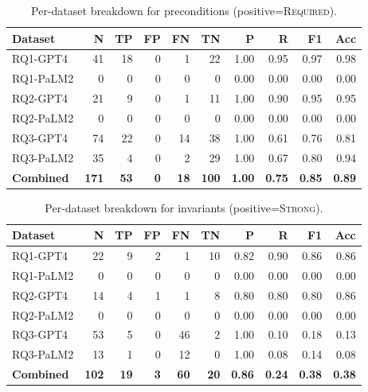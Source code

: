 \begin{table}[h]
  \centering
  \caption{Per-dataset breakdown for preconditions (positive=\textsc{Required}).}
  \label{tab:preconditions}
  \begin{tabular}{lrrrrrrrrr}
    \toprule
    \textbf{Dataset} & \textbf{N} & \textbf{TP} & \textbf{FP} & \textbf{FN} & \textbf{TN} & \textbf{P} & \textbf{R}  & \textbf{F1} & \textbf{Acc} \\
    \midrule
    RQ1-GPT4  & 41  & 18 & 0 & 1 & 22 & 1.00 & 0.95 & 0.97 & 0.98 \\
    RQ1-PaLM2  & 0  & 0 & 0 & 0 & 0 & 0.00 & 0.00 & 0.00 & 0.00 \\
    RQ2-GPT4  & 21  & 9 & 0 & 1 & 11 & 1.00 & 0.90 & 0.95 & 0.95 \\
    RQ2-PaLM2  & 0  & 0 & 0 & 0 & 0 & 0.00 & 0.00 & 0.00 & 0.00 \\
    RQ3-GPT4  & 74  & 22 & 0 & 14 & 38 & 1.00 & 0.61 & 0.76 & 0.81 \\
    RQ3-PaLM2  & 35  & 4 & 0 & 2 & 29 & 1.00 & 0.67 & 0.80 & 0.94 \\
    \midrule
    \textbf{Combined} & \textbf{171} & \textbf{53} & \textbf{0} & \textbf{18} & \textbf{100} & \textbf{1.00} & \textbf{0.75} & \textbf{0.85} & \textbf{0.89} \\
    \bottomrule
  \end{tabular}
\end{table}

\begin{table}[h]
  \centering
  \caption{Per-dataset breakdown for invariants (positive=\textsc{Strong}).}
  \label{tab:invariants}
  \begin{tabular}{lrrrrrrrrr}
    \toprule
    \textbf{Dataset} & \textbf{N} & \textbf{TP} & \textbf{FP} & \textbf{FN} & \textbf{TN} & \textbf{P} & \textbf{R}  & \textbf{F1} & \textbf{Acc} \\
    \midrule
    RQ1-GPT4  & 22  & 9 & 2 & 1 & 10 & 0.82 & 0.90 & 0.86 & 0.86 \\
    RQ1-PaLM2  & 0  & 0 & 0 & 0 & 0 & 0.00 & 0.00 & 0.00 & 0.00 \\
    RQ2-GPT4  & 14  & 4 & 1 & 1 & 8 & 0.80 & 0.80 & 0.80 & 0.86 \\
    RQ2-PaLM2  & 0  & 0 & 0 & 0 & 0 & 0.00 & 0.00 & 0.00 & 0.00 \\
    RQ3-GPT4  & 53  & 5 & 0 & 46 & 2 & 1.00 & 0.10 & 0.18 & 0.13 \\
    RQ3-PaLM2  & 13  & 1 & 0 & 12 & 0 & 1.00 & 0.08 & 0.14 & 0.08 \\
    \midrule
    \textbf{Combined} & \textbf{102} & \textbf{19} & \textbf{3} & \textbf{60} & \textbf{20} & \textbf{0.86} & \textbf{0.24} & \textbf{0.38} & \textbf{0.38} \\
    \bottomrule
  \end{tabular}
\end{table}